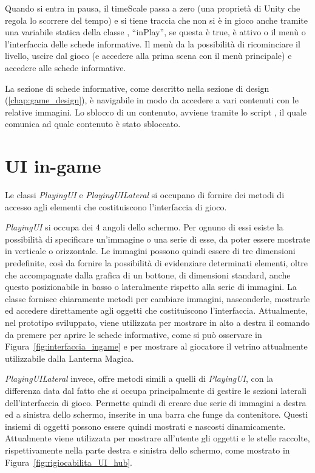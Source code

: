 Quando si entra in pausa, il timeScale passa a zero (una proprietà di Unity che regola lo scorrere del tempo) e si tiene traccia che non si è in gioco anche tramite una variabile statica della classe , ``inPlay'', se questa è true, è attivo o il menù o l'interfaccia delle schede informative.
Il menù da la possibilità di ricominciare il livello, uscire dal gioco (e accedere alla prima scena con il menù principale) e accedere alle schede informative. 

La sezione di schede informative, come descritto nella sezione di design (\ref{chap:game_design}), è navigabile in modo da accedere a vari contenuti con le relative immagini. Lo sblocco di un contenuto, avviene tramite lo script , il quale comunica ad  quale contenuto è stato sbloccato.

\section{UI in-game}

Le classi \textit{PlayingUI} e \textit{PlayingUILateral} si occupano di fornire dei metodi di accesso agli elementi che costituiscono l’interfaccia di gioco.

\textit{PlayingUI} si occupa dei 4 angoli dello schermo. Per ognuno di essi esiste la possibilità di specificare un’immagine o una serie di esse, da poter essere mostrate in verticale o orizzontale.
Le immagini possono quindi essere di tre dimensioni predefinite, così da fornire la possibilità di evidenziare determinati elementi, oltre che accompagnate dalla grafica di un bottone, di dimensioni standard, anche questo posizionabile in basso o lateralmente rispetto alla serie di immagini.
La classe fornisce chiaramente metodi per cambiare immagini, nasconderle, mostrarle ed accedere direttamente agli oggetti che costituiscono l’interfaccia.
Attualmente, nel prototipo sviluppato, viene utilizzata per mostrare in alto a destra il comando da premere per aprire le schede informative, come si può osservare in Figura~\ref{fig:interfaccia_ingame} e per mostrare al giocatore il vetrino attualmente utilizzabile dalla Lanterna Magica.

\textit{PlayingUILateral} invece, offre metodi simili a quelli di \textit{PlayingUI}, con la differenza data dal fatto che si occupa principalmente di gestire le sezioni laterali dell’interfaccia di gioco.
Permette quindi di creare due serie di immagini a destra ed a sinistra dello schermo, inserite in una barra che funge da contenitore. Questi insiemi di oggetti possono essere quindi mostrati e nascosti dinamicamente.
Attualmente viene utilizzata per mostrare all’utente gli oggetti e le stelle raccolte, rispettivamente nella parte destra e sinistra dello schermo, come mostrato in Figura~\ref{fig:rigiocabilita_UI_hub}.


